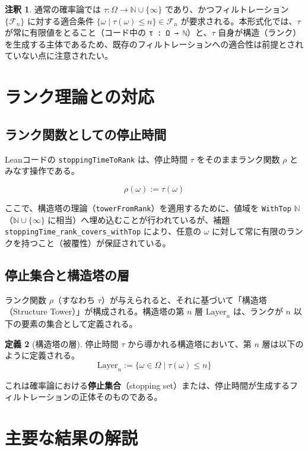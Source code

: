 \documentclass[a4paper,11pt]{ltjsarticle}
\theoremstyle{definition}
\newtheorem{definition}{定義}[section]
\newtheorem{remark}[definition]{注釈}
\newcommand{\N}{\mathbb{N}}
\newcommand{\OmegaSpace}{\Omega}
\newcommand{\F}{\mathcal{F}}
\newcommand{\Layer}[1]{\mathrm{Layer}_{#1}}
\newcommand{\Rank}{\rho}
\newcommand{\Tau}{\tau}
\newcommand{\code}[1]{\texttt{#1}}
\begin{document}
\begin{remark}
通常の確率論では $\Tau: \OmegaSpace \to \N \cup \{\infty\}$ であり、かつフィルトレーション $\{\F_n\}$ に対する適合条件 $\{\omega \mid \Tau(\omega) \le n\} \in \F_n$ が要求される。本形式化では、$\Tau$ が常に有限値をとること（コード中の \code{τ : Ω → ℕ}）と、$\Tau$ 自身が構造（ランク）を生成する主体であるため、既存のフィルトレーションへの適合性は前提とされていない点に注意されたい。
\end{remark}

\section{ランク理論との対応}

\subsection{ランク関数としての停止時間}
Leanコードの \code{stoppingTimeToRank} は、停止時間 $\Tau$ をそのままランク関数 $\Rank$ とみなす操作である。

\begin{equation}
    \Rank(\omega) := \Tau(\omega)
\end{equation}

ここで、構造塔の理論（\code{towerFromRank}）を適用するために、値域を \code{WithTop} $\N$（$\N \cup \{\infty\}$ に相当）へ埋め込むことが行われているが、補題 \code{stoppingTime\_rank\_covers\_withTop} により、任意の $\omega$ に対して常に有限のランクを持つこと（被覆性）が保証されている。

\subsection{停止集合と構造塔の層}
ランク関数 $\Rank$（すなわち $\Tau$）が与えられると、それに基づいて「構造塔（Structure Tower）」が構成される。構造塔の第 $n$ 層 $\Layer{n}$ は、ランクが $n$ 以下の要素の集合として定義される。

\begin{definition}[構造塔の層]
停止時間 $\Tau$ から導かれる構造塔において、第 $n$ 層は以下のように定義される。
\[
    \Layer{n} := \{ \omega \in \OmegaSpace \mid \Tau(\omega) \le n \}
\]
\end{definition}

これは確率論における\textbf{停止集合}（stopping set）または、停止時間が生成するフィルトレーションの正体そのものである。

\section{主要な結果の解説}
\end{document}
